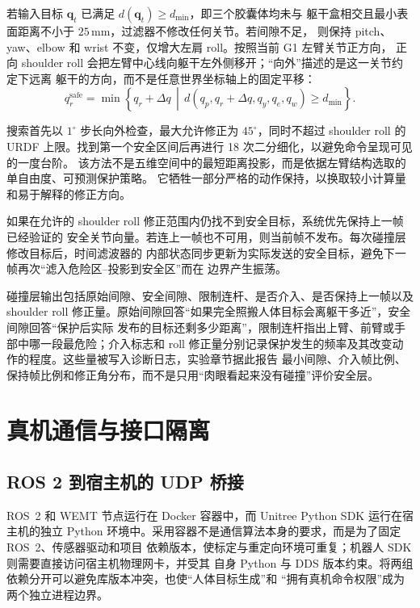 若输入目标 $\boldsymbol q_t$ 已满足 $d(\boldsymbol q_t)\ge d_{\min}$，即三个胶囊体均未与
躯干盒相交且最小表面距离不小于 $25\,\mathrm{mm}$，过滤器不修改任何关节。若间隙不足，
则保持 pitch、yaw、elbow 和 wrist 不变，仅增大左肩 roll。按照当前 G1 左臂关节正方向，
正向 shoulder roll 会把左臂中心线向躯干左外侧移开；“向外”描述的是这一关节约定下远离
躯干的方向，而不是任意世界坐标轴上的固定平移：
\begin{equation}
  q_r^{\mathrm{safe}}=
  \min\left\{q_r+\Delta q\,\middle|\,
  d(q_p,q_r+\Delta q,q_y,q_e,q_w)\ge d_{\min}\right\}.
  \label{eq:ch5_roll_collision_projection}
\end{equation}

搜索首先以 $1^\circ$ 步长向外检查，最大允许修正为 $45^\circ$，同时不超过 shoulder roll
的 URDF 上限。找到第一个安全区间后再进行 18 次二分细化，以避免命令呈现可见的一度台阶。
该方法不是五维空间中的最短距离投影，而是依据左臂结构选取的单自由度、可预测保护策略。
它牺牲一部分严格的动作保持，以换取较小计算量和易于解释的修正方向。

如果在允许的 shoulder roll 修正范围内仍找不到安全目标，系统优先保持上一帧已经验证的
安全关节向量。若连上一帧也不可用，则当前帧不发布。每次碰撞层修改目标后，时间滤波器的
内部状态同步更新为实际发送的安全目标，避免下一帧再次“滤入危险区--投影到安全区”而在
边界产生振荡。

碰撞层输出包括原始间隙、安全间隙、限制连杆、是否介入、是否保持上一帧以及 shoulder
roll 修正量。原始间隙回答“如果完全照搬人体目标会离躯干多近”，安全间隙回答“保护后实际
发布的目标还剩多少距离”，限制连杆指出上臂、前臂或手部中哪一段最危险；介入标志和 roll
修正量分别记录保护发生的频率及其改变动作的程度。这些量被写入诊断日志，实验章节据此报告
最小间隙、介入帧比例、保持帧比例和修正角分布，而不是只用“肉眼看起来没有碰撞”评价安全层。

\section{真机通信与接口隔离}
\label{sec:ch5_real_robot_interface}

\subsection{ROS 2 到宿主机的 UDP 桥接}
\label{subsec:ch5_udp_bridge}

ROS~2 和 WEMT 节点运行在 Docker 容器中，而 Unitree Python SDK 运行在宿主机的独立
Python 环境中。采用容器不是通信算法本身的要求，而是为了固定 ROS~2、传感器驱动和项目
依赖版本，使标定与重定向环境可重复；机器人 SDK 则需要直接访问宿主机物理网卡，并受其
自身 Python 与 DDS 版本约束。将两组依赖分开可以避免库版本冲突，也使“人体目标生成”和
“拥有真机命令权限”成为两个独立进程边界。

